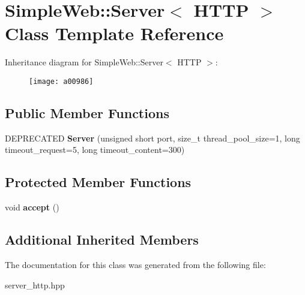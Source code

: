 \hypertarget{a00986}{}\section{Simple\+Web\+:\+:Server$<$ H\+T\+TP $>$ Class Template Reference}
\label{a00986}
Inheritance diagram for Simple\+Web\+:\+:Server$<$ H\+T\+TP $>$\+:\begin{figure}[H]
\begin{center}
\leavevmode
\texttt{[image: a00986]}
\end{center}
\end{figure}
\subsection*{Public Member Functions}
\begin{DoxyCompactItemize}
\item 
\mbox{\label{a00986_a926e5ebedafc2d17a944698197b7f002}} 
D\+E\+P\+R\+E\+C\+A\+T\+ED {\bfseries Server} (unsigned short port, size\+\_\+t thread\+\_\+pool\+\_\+size=1, long timeout\+\_\+request=5, long timeout\+\_\+content=300)
\end{DoxyCompactItemize}
\subsection*{Protected Member Functions}
\begin{DoxyCompactItemize}
\item 
\mbox{\label{a00986_abe9f9de361dcb01541e0302eac21986d}} 
void {\bfseries accept} ()
\end{DoxyCompactItemize}
\subsection*{Additional Inherited Members}


The documentation for this class was generated from the following file\+:\begin{DoxyCompactItemize}
\item 
server\+\_\+http.\+hpp\end{DoxyCompactItemize}
